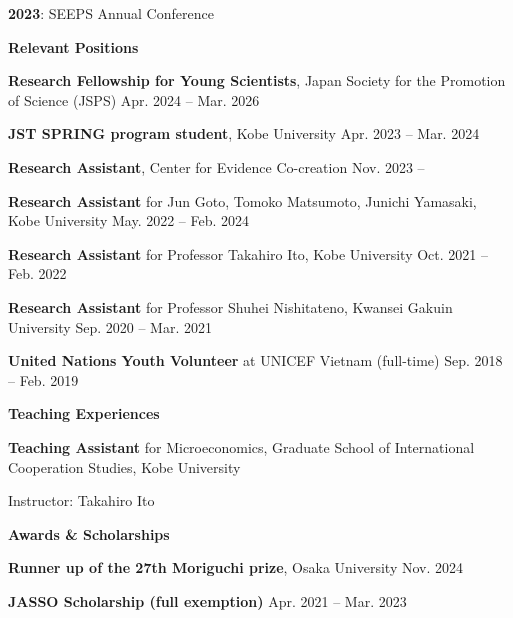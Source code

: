 \documentclass{article}
\begin{document}
\textbf{2023}: SEEPS Annual Conference

\hrulefill

\begin{flushleft}
  \textbf{\large{Relevant Positions}}
\end{flushleft}

\textbf{Research Fellowship for Young Scientists}, Japan Society for the Promotion of Science (JSPS) \hspace{\fill} Apr. 2024 -- Mar. 2026

\textbf{JST SPRING program student}, Kobe University \hspace{\fill} Apr. 2023 -- Mar. 2024

\textbf{Research Assistant}, Center for Evidence Co-creation \hspace{\fill} Nov. 2023 --

\textbf{Research Assistant} for Jun Goto, Tomoko Matsumoto, Junichi Yamasaki, Kobe University \hspace{\fill} May. 2022 -- Feb. 2024

\textbf{Research Assistant} for Professor Takahiro Ito, Kobe University \hspace{\fill} Oct. 2021 -- Feb. 2022

\textbf{Research Assistant} for Professor Shuhei Nishitateno, Kwansei Gakuin University \hspace{\fill} Sep. 2020 -- Mar. 2021

\textbf{United Nations Youth Volunteer} at UNICEF Vietnam (full-time) \hspace{\fill} Sep. 2018 -- Feb. 2019

\hrulefill

\begin{flushleft}
  \textbf{\large{Teaching Experiences}}
\end{flushleft}

\textbf{Teaching Assistant} for Microeconomics, Graduate School of International Cooperation Studies, Kobe University

Instructor: Takahiro Ito

\hrulefill

\begin{flushleft}
  \textbf{\large{Awards \& Scholarships}}
\end{flushleft}

\textbf{Runner up of the 27th Moriguchi prize}, Osaka University \hspace{\fill} Nov. 2024

\textbf{JASSO Scholarship (full exemption)} \hspace{\fill} Apr. 2021 -- Mar. 2023
\end{document}
